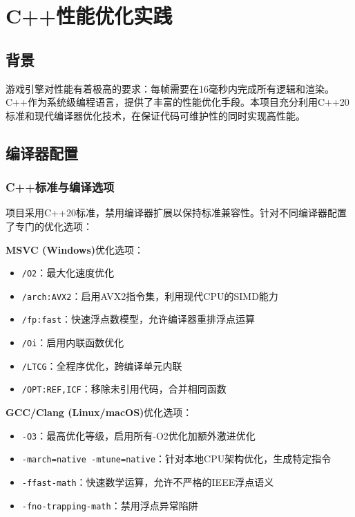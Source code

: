 \section{C++性能优化实践}
\label{sec:cpp_optimization}

\subsection{背景}

游戏引擎对性能有着极高的要求：每帧需要在16毫秒内完成所有逻辑和渲染。C++作为系统级编程语言，提供了丰富的性能优化手段。本项目充分利用C++20标准和现代编译器优化技术，在保证代码可维护性的同时实现高性能。

\subsection{编译器配置}

\subsubsection{C++标准与编译选项}

项目采用C++20标准，禁用编译器扩展以保持标准兼容性。针对不同编译器配置了专门的优化选项：

\textbf{MSVC (Windows)}优化选项：
\begin{itemize}
    \item \texttt{/O2}：最大化速度优化
    \item \texttt{/arch:AVX2}：启用AVX2指令集，利用现代CPU的SIMD能力
    \item \texttt{/fp:fast}：快速浮点数模型，允许编译器重排浮点运算
    \item \texttt{/Oi}：启用内联函数优化
    \item \texttt{/LTCG}：全程序优化，跨编译单元内联
    \item \texttt{/OPT:REF,ICF}：移除未引用代码，合并相同函数
\end{itemize}

\textbf{GCC/Clang (Linux/macOS)}优化选项：
\begin{itemize}
    \item \texttt{-O3}：最高优化等级，启用所有-O2优化加额外激进优化
    \item \texttt{-march=native -mtune=native}：针对本地CPU架构优化，生成特定指令
    \item \texttt{-ffast-math}：快速数学运算，允许不严格的IEEE浮点语义
    \item \texttt{-fno-trapping-math}：禁用浮点异常陷阱
\end{itemize}

